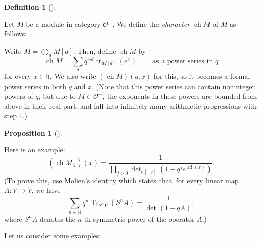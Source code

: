 \documentclass
[numbers=enddot,12pt,final,onecolumn,german,notitlepage]{scrartcl}%
\theoremstyle{definition}
\newtheorem{prop}[theo]{Proposition}
\newenvironment{proposition}[1][]
{\begin{prop}[#1]\begin{leftbar}}
{\end{leftbar}\end{prop}}
\newtheorem{defi}[theo]{Definition}
\newenvironment{definition}[1][]
{\begin{defi}[#1]\begin{leftbar}}
{\end{leftbar}\end{defi}}
\begin{document}
\begin{definition}
Let $M$ be a module in category $\mathcal{O}^{+}$. We define the
\textit{character} $\operatorname*{ch}M$ of $M$ as follows:

Write $M=\bigoplus\limits_{d}M\left[  d\right]  $. Then, define
$\operatorname*{ch}M$ by%
\[
\operatorname*{ch}M=\sum\limits_{d}q^{-d}\operatorname*{tr}\nolimits_{M\left[
d\right]  }\left(  e^{x}\right)  \ \ \ \ \ \ \ \ \ \ \text{as a power series
in }q
\]
for every $x\in\mathfrak{h}$. We also write $\left(  \operatorname*{ch}%
M\right)  \left(  q,x\right)  $ for this, so it becomes a formal power series
in both $q$ and $x$. (Note that this power series can contain noninteger
powers of $q$, but due to $M\in\mathcal{O}^{+}$, the exponents in these powers
are bounded from above in their real part, and fall into infinitely many
arithmetic progressions with step $1$.)
\end{definition}

\begin{proposition}
Here is an example:%
\[
\left(  \operatorname*{ch}M_{\lambda}^{+}\right)  \left(  x\right)  =\dfrac
{1}{\prod\limits_{j>0}\det\nolimits_{\mathfrak{g}\left[  -j\right]  }\left(
1-q^{j}e^{\operatorname*{ad}\left(  x\right)  }\right)  }.
\]
(To prove this, use Molien's identity which states that, for every linear map
$A:V\rightarrow V$, we have%
\[
\sum\limits_{n\in\mathbb{N}}q^{n}\operatorname*{Tr}\nolimits_{S^{n}V}\left(
S^{n}A\right)  =\dfrac{1}{\det\left(  1-qA\right)  },
\]
where $S^{n}A$ denotes the $n$-th symmetric power of the operator $A$.)
\end{proposition}

Let us consider some examples:
\end{document}
